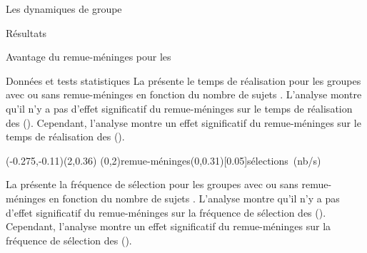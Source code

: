 \documentclass[myfrancais]{mythesis}
\begin{document}
\begin{mychapter}{Les dynamiques de groupe}
\begin{mysection}{Résultats}
\begin{mysubsection}{Avantage du remue-méninges pour les }
\begin{mysubsubsection}{Données et tests statistiques}
					La  présente le temps de réalisation  pour les groupes avec ou sans remue-méninges  en fonction du nombre de sujets .
					L'analyse montre qu'il n'y a pas d'effet significatif du remue-méninges  sur le temps de réalisation  des  ().
					Cependant, l'analyse montre un effet significatif du remue-méninges  sur le temps de réalisation  des  ().

					\begin{myfigure}
						\begin{myps}(-0.275,-0.11)(2,0.36)
							\myaxes(0,2){remue-méninges}(0,0.31)[0.05]{sélections~(nb/s)}
						\end{myps}
					\end{myfigure}

					La  présente la fréquence de sélection  pour les groupes avec ou sans remue-méninges  en fonction du nombre de sujets .
					L'analyse montre qu'il n'y a pas d'effet significatif du remue-méninges  sur la fréquence de sélection  des  ().
					Cependant, l'analyse montre un effet significatif du remue-méninges  sur la fréquence de sélection  des  ().


\end{mysubsubsection}
\end{mysubsection}
\end{mysection}
\end{mychapter}
\end{document}
